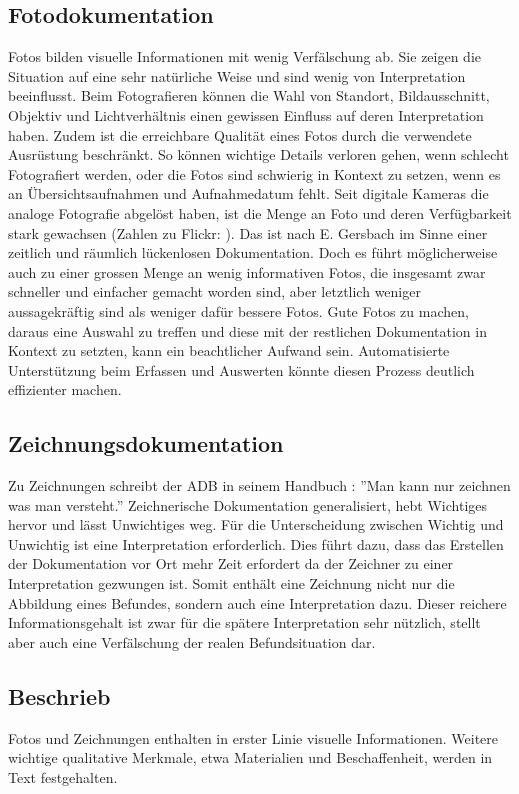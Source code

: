 		\subsection{Fotodokumentation}
			Fotos bilden visuelle Informationen mit wenig Verfälschung ab. Sie zeigen die Situation auf eine sehr natürliche Weise und sind wenig von Interpretation beeinflusst.
			Beim Fotografieren können die Wahl von Standort, Bildausschnitt, Objektiv und Lichtverhältnis einen gewissen Einfluss auf deren Interpretation haben. Zudem ist die erreichbare Qualität eines Fotos durch die verwendete Ausrüstung beschränkt.
			So können wichtige Details verloren gehen, wenn schlecht Fotografiert werden, oder die Fotos sind schwierig in Kontext zu setzen, wenn es an Übersichtsaufnahmen und Aufnahmedatum fehlt.
			Seit digitale Kameras die analoge Fotografie abgelöst haben, ist die Menge an Foto und deren Verfügbarkeit stark gewachsen (Zahlen zu Flickr: ). Das ist nach E. Gersbach  im Sinne einer zeitlich und räumlich lückenlosen Dokumentation.
			Doch es führt möglicherweise auch zu einer grossen Menge an wenig informativen Fotos, die insgesamt zwar schneller und einfacher gemacht worden sind, aber letztlich weniger aussagekräftig sind als weniger dafür bessere Fotos.
			Gute Fotos zu machen, daraus eine Auswahl zu treffen und diese mit der restlichen Dokumentation in Kontext zu setzten, kann ein beachtlicher Aufwand sein.
			Automatisierte Unterstützung beim Erfassen und Auswerten könnte diesen Prozess deutlich effizienter machen.

		\subsection{Zeichnungsdokumentation}
			Zu Zeichnungen schreibt der ADB in seinem Handbuch : ''Man kann nur zeichnen was man versteht.''
			Zeichnerische Dokumentation generalisiert, hebt Wichtiges hervor und lässt Unwichtiges weg. Für die Unterscheidung zwischen Wichtig und Unwichtig ist eine Interpretation erforderlich.
			Dies führt dazu, dass das Erstellen der Dokumentation vor Ort mehr Zeit erfordert da der Zeichner zu einer Interpretation gezwungen ist. Somit enthält eine Zeichnung nicht nur die Abbildung eines Befundes, sondern auch eine Interpretation dazu. Dieser reichere Informationsgehalt ist zwar für die spätere Interpretation sehr nützlich, stellt aber auch eine Verfälschung der realen Befundsituation dar.
			
		\subsection{Beschrieb}
			Fotos und Zeichnungen enthalten in erster Linie visuelle Informationen. Weitere wichtige qualitative Merkmale, etwa Materialien und Beschaffenheit, werden in Text festgehalten.
		
